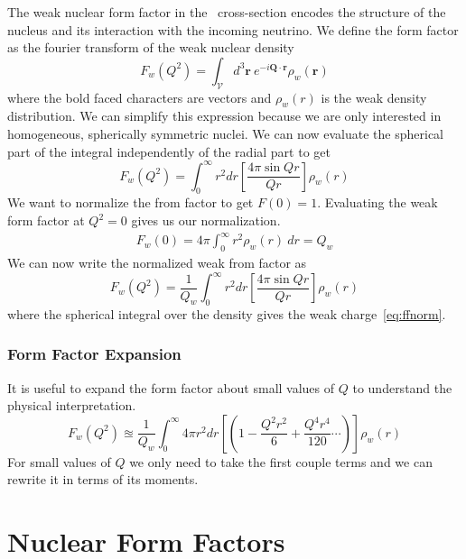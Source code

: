 The weak nuclear form factor in the \cevns\ cross-section encodes the structure of the nucleus and its interaction with the incoming neutrino. We define the form factor as the fourier transform of the weak nuclear density
\begin{equation}
F_{w}(Q^2) = \int_{\mathcal{V}}d^3\mathbf{r}\ e^{-i\mathbf{Q}\cdot \mathbf{r}}\rho_{w}(\mathbf{r})
\end{equation}
where the bold faced characters are vectors and $\rho _w(r)$ is the weak density distribution. We can simplify this expression because we are only interested in homogeneous, spherically symmetric nuclei. We can now evaluate the spherical part of the integral independently of the radial part to get
\begin{equation}
F_w(Q^2) = \int_0^{\infty}r^2dr\left[\frac{4\pi \sin Qr}{Qr}\right] \rho _w(r)
\end{equation}
We want to normalize the from factor to get $F(0)=1$. Evaluating the weak form factor at $Q^2=0$ gives us our normalization. 
\begin{align}\label{eq:ffnorm}
F_w(0)=4\pi \int_0^{\infty}r^2 \rho _w(r)\ dr = Q_w
\end{align} 
We can now write the normalized weak from factor as 
\begin{equation}
\boxed{
F_w(Q^2) = \frac{1}{Q_w} \int_0^{\infty}r^2dr\left[\frac{4\pi \sin Qr}{Qr}\right] \rho _w(r)
}
\end{equation}
where the spherical integral over the density gives the weak charge~\eqref{eq:ffnorm}. 

\subsubsection{Form Factor Expansion}

It is useful to expand the form factor about small values of $Q$ to understand the physical interpretation. 
\begin{equation}
F_w(Q^2) \approxeq \frac{1}{Q_w} \int_0^{\infty}4\pi r^2dr\left[ \left( 1-\frac{Q^2r^2}{6}+\frac{Q^4r^4}{120} \cdots \right) \right] \rho _w(r)
\end{equation}
For small values of $Q$ we only need to take the first couple terms and we can rewrite it in terms of its moments. 



\section{Nuclear Form Factors}
\label{sec:nuclearff}
